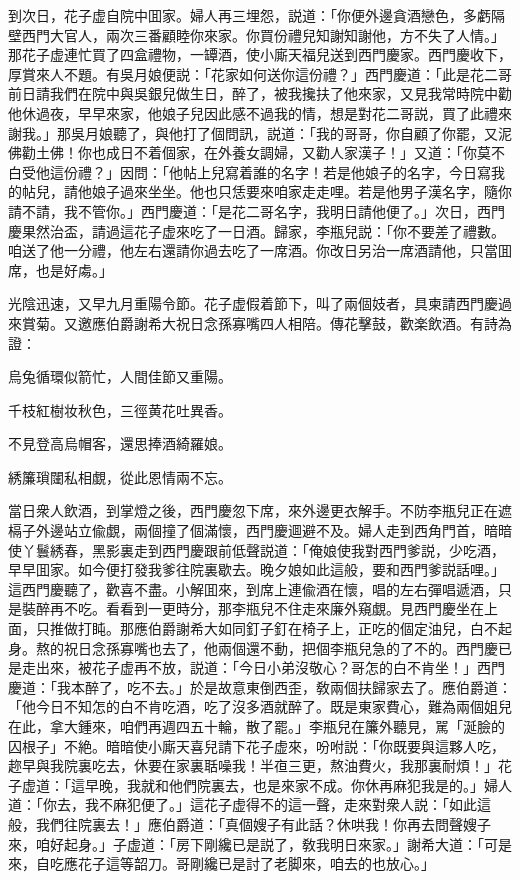 到次日，花子虚自院中囬家。婦人再三埋怨，説道：「你便外邊貪酒戀色，多虧隔壁西門大官人，兩次三番顧睦你來家。你買份禮兒知謝知謝他，方不失了人情。」那花子虚連忙買了四盒禮物，一罈酒，使小廝天福兒送到西門慶家。西門慶收下，厚賞來人不題。有吳月娘便説：「花家如何送你這份禮？」西門慶道：「此是花二哥前日請我們在院中與吳銀兒做生日，醉了，被我攙扶了他來家，又見我常時院中勸他休過夜，早早來家，他娘子兒因此感不過我的情，想是對花二哥説，買了此禮來謝我。」那吳月娘聽了，與他打了個問訊，説道：「我的哥哥，你自顧了你罷，又泥佛勸土佛！你也成日不着個家，在外養女調婦，又勸人家漢子！」又道：「你莫不白受他這份禮？」因問：「他帖上兒寫着誰的名字！若是他娘子的名字，今日寫我的帖兒，請他娘子過來坐坐。他也只恁要來咱家走走哩。若是他男子漢名字，隨你請不請，我不管你。」西門慶道：「是花二哥名字，我明日請他便了。」次日，西門慶果然治盃，請過這花子虚來吃了一日酒。歸家，李瓶兒説：「你不要差了禮數。咱送了他一分禮，他左右還請你過去吃了一席酒。你改日另治一席酒請他，只當囬席，也是好䖏。」

光陰迅速，又早九月重陽令節。花子虚假着節下，叫了兩個妓者，具柬請西門慶過來賞菊。又邀應伯爵謝希大祝日念孫寡嘴四人相陪。傳花擊鼓，歡楽飲酒。有詩為證：

烏兔循環似箭忙，人間佳節又重陽。

千枝紅樹妆秋色，三徑黄花吐異香。

不見登高烏帽客，還思捧酒綺羅娘。

綉簾瑣闥私相覷，從此恩情兩不忘。

當日衆人飲酒，到掌燈之後，西門慶忽下席，來外邊更衣解手。不防李瓶兒正在遮槅子外邊站立偸覷，兩個撞了個滿懷，西門慶逥避不及。婦人走到西角門首，暗暗使丫鬟綉春，黑影裏走到西門慶跟前低聲説道：「俺娘使我對西門爹説，少吃酒，早早囬家。如今便打發我爹往院裏歇去。晚夕娘如此這般，要和西門爹説話哩。」這西門慶聽了，歡喜不盡。小解囬來，到席上連偸酒在懷，唱的左右彈唱遞酒，只是裝醉再不吃。看看到一更時分，那李瓶兒不住走來廉外窺覷。見西門慶坐在上面，只推做打盹。那應伯爵謝希大如同釘子釘在椅子上，正吃的個定油兒，白不起身。熬的祝日念孫寡嘴也去了，他兩個還不動，把個李瓶兒急的了不的。西門慶已是走出來，被花子虚再不放，説道：「今日小弟沒敬心？哥怎的白不肯坐！」西門慶道：「我本醉了，吃不去。」於是故意東倒西歪，敎兩個扶歸家去了。應伯爵道：「他今日不知怎的白不肯吃酒，吃了沒多酒就醉了。既是東家費心，難為兩個姐兒在此，拿大鍾來，咱們再週四五十輪，散了罷。」李瓶兒在簾外聽見，駡「涎臉的囚根子」不絶。暗暗使小廝天喜兒請下花子虚來，吩咐説：「你既要與這夥人吃，趂早與我院裏吃去，休要在家裏聒噪我！半亱三更，熬油費火，我那裏耐煩！」花子虚道：「這早晚，我就和他們院裏去，也是來家不成。你休再麻犯我是的。」婦人道：「你去，我不麻犯便了。」這花子虚得不的這一聲，走來對衆人説：「如此這般，我們往院裏去！」應伯爵道：「真個嫂子有此話？休哄我！你再去問聲嫂子來，咱好起身。」子虚道：「房下剛纔已是説了，敎我明日來家。」謝希大道：「可是來，自吃應花子這等韶刀。哥剛纔已是討了老脚來，咱去的也放心。」

